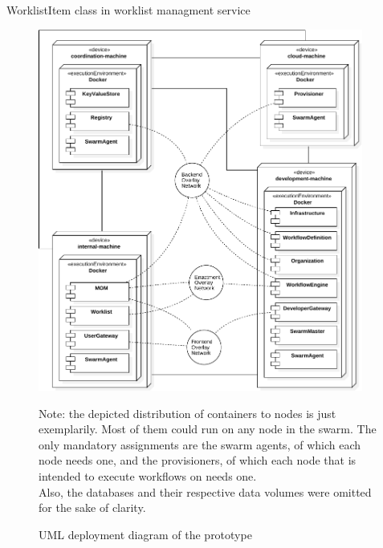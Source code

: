     \begin{listing}[!h]
      \inputminted[fontsize=\footnotesize,linenos=true,numberblanklines=true,showspaces=false,breaklines=true,baselinestretch=1]{ruby}{../code/worklist/models/worklist_item.rb}
      \caption{WorklistItem class in worklist managment service}
    \label{lst:worklist_item_in_organization_managment_service}
    \end{listing}

\clearpage
{}

  \begin{figure}[htbp]
    \centering
    \includegraphics[width=0.95\textwidth]{content/images/deployment_diagram-crop.pdf}
    \caption*{\scriptsize Note: the depicted distribution of containers to nodes is just exemplarily. Most of them could run on any node in the swarm. The only mandatory assignments are the swarm agents, of which each node needs one, and the provisioners, of which each node that is intended to execute workflows on needs one. \\Also, the databases and their respective data volumes were omitted for the sake of clarity.}
    \caption{UML deployment diagram of the prototype}
    \label{fig:deployment_diagram_of_the_architecture}
  \end{figure}

